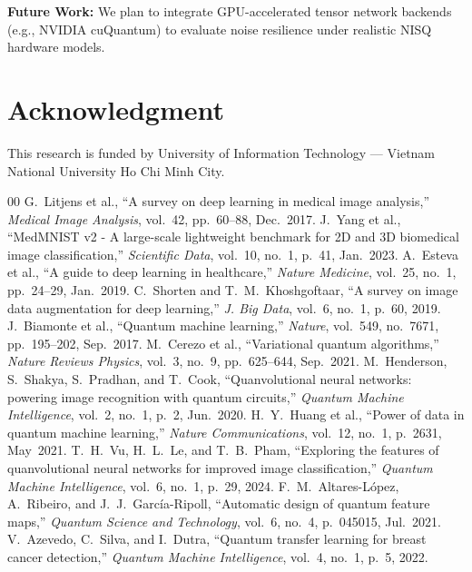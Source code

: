 \documentclass[journal]{IEEEtran}
\begin{document}
\textbf{Future Work:} We plan to integrate GPU-accelerated tensor network backends (e.g., NVIDIA cuQuantum) to evaluate noise resilience under realistic NISQ hardware models.

\section*{Acknowledgment}
This research is funded by University of Information Technology --- Vietnam National University Ho Chi Minh City.

\begin{thebibliography}{00}
 G.~Litjens et al., ``A survey on deep learning in medical image analysis,'' \textit{Medical Image Analysis}, vol.~42, pp.~60--88, Dec.~2017.
 J.~Yang et al., ``MedMNIST v2 - A large-scale lightweight benchmark for 2D and 3D biomedical image classification,'' \textit{Scientific Data}, vol.~10, no.~1, p.~41, Jan.~2023.
 A.~Esteva et al., ``A guide to deep learning in healthcare,'' \textit{Nature Medicine}, vol.~25, no.~1, pp.~24--29, Jan.~2019.
 C.~Shorten and T.~M.~Khoshgoftaar, ``A survey on image data augmentation for deep learning,'' \textit{J. Big Data}, vol.~6, no.~1, p.~60, 2019.
 J.~Biamonte et al., ``Quantum machine learning,'' \textit{Nature}, vol.~549, no.~7671, pp.~195--202, Sep.~2017.
 M.~Cerezo et al., ``Variational quantum algorithms,'' \textit{Nature Reviews Physics}, vol.~3, no.~9, pp.~625--644, Sep.~2021.
 M.~Henderson, S.~Shakya, S.~Pradhan, and T.~Cook, ``Quanvolutional neural networks: powering image recognition with quantum circuits,'' \textit{Quantum Machine Intelligence}, vol.~2, no.~1, p.~2, Jun.~2020.
 H.~Y.~Huang et al., ``Power of data in quantum machine learning,'' \textit{Nature Communications}, vol.~12, no.~1, p.~2631, May~2021.
 T.~H.~Vu, H.~L.~Le, and T.~B.~Pham, ``Exploring the features of quanvolutional neural networks for improved image classification,'' \textit{Quantum Machine Intelligence}, vol.~6, no.~1, p.~29, 2024.
 F.~M.~Altares-L{\'o}pez, A.~Ribeiro, and J.~J.~Garc{\'i}a-Ripoll, ``Automatic design of quantum feature maps,'' \textit{Quantum Science and Technology}, vol.~6, no.~4, p.~045015, Jul.~2021.
 V.~Azevedo, C.~Silva, and I.~Dutra, ``Quantum transfer learning for breast cancer detection,'' \textit{Quantum Machine Intelligence}, vol.~4, no.~1, p.~5, 2022.

\end{thebibliography}
\end{document}
